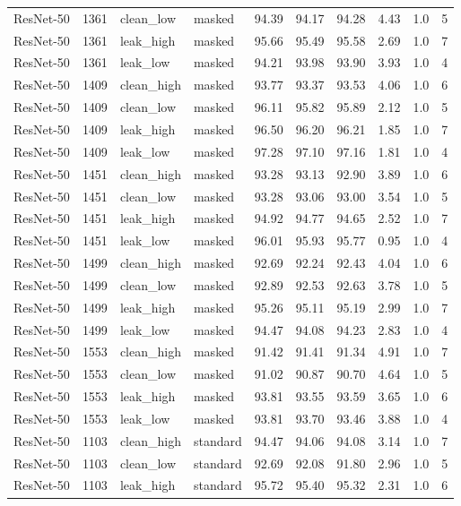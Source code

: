 {\begin{longtable}{lrllrrrrrr}
ResNet-50 & 1361 & clean\_low & masked & 94.39 & 94.17 & 94.28 & 4.43 & 1.0 & 5 \\
ResNet-50 & 1361 & leak\_high & masked & 95.66 & 95.49 & 95.58 & 2.69 & 1.0 & 7 \\
ResNet-50 & 1361 & leak\_low & masked & 94.21 & 93.98 & 93.90 & 3.93 & 1.0 & 4 \\
ResNet-50 & 1409 & clean\_high & masked & 93.77 & 93.37 & 93.53 & 4.06 & 1.0 & 6 \\
ResNet-50 & 1409 & clean\_low & masked & 96.11 & 95.82 & 95.89 & 2.12 & 1.0 & 5 \\
ResNet-50 & 1409 & leak\_high & masked & 96.50 & 96.20 & 96.21 & 1.85 & 1.0 & 7 \\
ResNet-50 & 1409 & leak\_low & masked & 97.28 & 97.10 & 97.16 & 1.81 & 1.0 & 4 \\
ResNet-50 & 1451 & clean\_high & masked & 93.28 & 93.13 & 92.90 & 3.89 & 1.0 & 6 \\
ResNet-50 & 1451 & clean\_low & masked & 93.28 & 93.06 & 93.00 & 3.54 & 1.0 & 5 \\
ResNet-50 & 1451 & leak\_high & masked & 94.92 & 94.77 & 94.65 & 2.52 & 1.0 & 7 \\
ResNet-50 & 1451 & leak\_low & masked & 96.01 & 95.93 & 95.77 & 0.95 & 1.0 & 4 \\
ResNet-50 & 1499 & clean\_high & masked & 92.69 & 92.24 & 92.43 & 4.04 & 1.0 & 6 \\
ResNet-50 & 1499 & clean\_low & masked & 92.89 & 92.53 & 92.63 & 3.78 & 1.0 & 5 \\
ResNet-50 & 1499 & leak\_high & masked & 95.26 & 95.11 & 95.19 & 2.99 & 1.0 & 7 \\
ResNet-50 & 1499 & leak\_low & masked & 94.47 & 94.08 & 94.23 & 2.83 & 1.0 & 4 \\
ResNet-50 & 1553 & clean\_high & masked & 91.42 & 91.41 & 91.34 & 4.91 & 1.0 & 7 \\
ResNet-50 & 1553 & clean\_low & masked & 91.02 & 90.87 & 90.70 & 4.64 & 1.0 & 5 \\
ResNet-50 & 1553 & leak\_high & masked & 93.81 & 93.55 & 93.59 & 3.65 & 1.0 & 6 \\
ResNet-50 & 1553 & leak\_low & masked & 93.81 & 93.70 & 93.46 & 3.88 & 1.0 & 4 \\
ResNet-50 & 1103 & clean\_high & standard & 94.47 & 94.06 & 94.08 & 3.14 & 1.0 & 7 \\
ResNet-50 & 1103 & clean\_low & standard & 92.69 & 92.08 & 91.80 & 2.96 & 1.0 & 5 \\
ResNet-50 & 1103 & leak\_high & standard & 95.72 & 95.40 & 95.32 & 2.31 & 1.0 & 6 \\

\end{longtable}}
